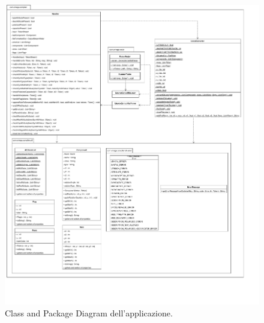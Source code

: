 \begin{figure}[h!]
	\centering
	\includegraphics[width=\textwidth]{./ImageFiles/class and package diagram.pdf}
	\caption{Class and Package Diagram dell'applicazione.}
	\label{fig:class_diagram}
\end{figure}

\newpage
